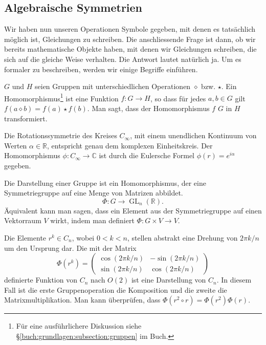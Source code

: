 \subsection{Algebraische Symmetrien}
Wir haben nun unseren Operationen Symbole gegeben, mit denen es tatsächlich möglich ist, Gleichungen zu schreiben.
Die anschliessende Frage ist dann, ob wir bereits mathematische Objekte haben, mit denen wir Gleichungen schreiben, die sich auf die gleiche Weise verhalten.
Die Antwort lautet natürlich ja.
Um es formaler zu beschreiben, werden wir einige Begriffe einführen.
\begin{definition}[Gruppenhomomorphismus]
  \(G\) und \(H\) seien  Gruppen mit unterschiedlichen Operationen \(\diamond\) bzw.
  \(\star\).
  Ein Homomorphismus\footnote{ Für eine ausführlichere Diskussion siehe \S\ref{buch:grundlagen:subsection:gruppen} im Buch.} ist eine Funktion \(f: G \to H\), so dass für jedes \(a, b \in G\) gilt \(f(a\diamond b) = f(a) \star f(b)\).
  Man sagt, dass der Homomorphismus \(f\) \(G\) in \(H\) transformiert.
\end{definition}
\begin{beispiel}
  Die Rotationssymmetrie des Kreises \(C_\infty\), mit einem unendlichen Kontinuum von Werten \(\alpha \in \mathbb{R}\), entspricht genau dem komplexen Einheitskreis.
  Der Homomorphismus \(\phi: C_\infty \to \mathbb{C}\) ist durch die Eulersche Formel \(\phi(r) = e^{i\alpha}\) gegeben.
\end{beispiel}

\begin{definition}
  Die Darstellung einer Gruppe ist ein Homomorphismus, der eine Symmetriegruppe auf eine Menge von Matrizen abbildet.
  \[
    \Phi: G \to \operatorname{GL}_n(\mathbb{R}).
  \]
  Äquivalent kann man sagen, dass ein Element aus der Symmetriegruppe auf einen Vektorraum \(V\) wirkt, indem man definiert \(\Phi : G \times V \to V\).
\end{definition}
\begin{beispiel}
  Die Elemente \(r^k \in C_n\), wobei \(0 < k < n\), stellen abstrakt eine Drehung von \(2\pi k/n\) um den Ursprung dar.
  Die mit der Matrix 
  \[
    \Phi(r^k) = \begin{pmatrix}
      \cos(2\pi k/n) & -\sin(2\pi k/n) \\
      \sin(2\pi k/n) &  \cos(2\pi k/n)
    \end{pmatrix}
  \]
  definierte Funktion von \(C_n\) nach \(O(2)\) ist eine Darstellung von \(C_n\).
  In diesem Fall ist die erste Gruppenoperation die Komposition und die zweite die Matrixmultiplikation.
  Man kann überprüfen, dass \(\Phi(r^2 \circ r) = \Phi(r^2)\Phi(r)\).
\end{beispiel}

